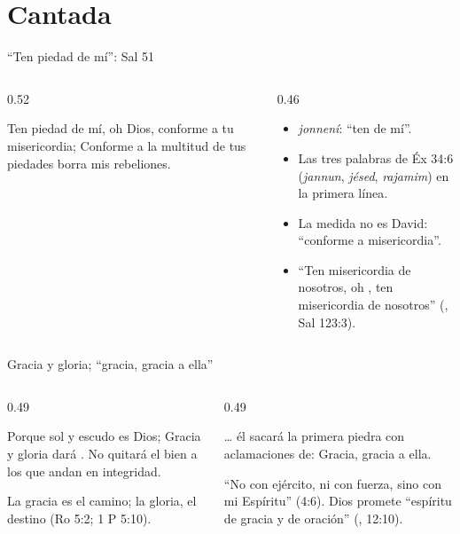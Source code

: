 \section{Cantada}

\begin{frame}{``Ten piedad de mí'': Sal 51}
\begin{columns}[c,onlytextwidth]
\begin{column}{0.52\textwidth}
\centering{}
\begin{cita}Ten piedad de mí, oh Dios, conforme a tu misericordia; Conforme a la multitud de tus piedades borra mis rebeliones.\end{cita}
\end{column}
\begin{column}{0.46\textwidth}\small\RaggedRight
\begin{itemize}
\item {} \emph{jonnení}: ``ten  de mí''.
\item Las tres palabras de Éx 34:6 (\emph{jannun}, \emph{jésed}, \emph{rajamim}) en la primera línea.
\item La medida no es David: ``conforme a  misericordia''.
\item ``Ten misericordia de nosotros, oh \SENOR, ten misericordia de nosotros'' (, Sal 123:3).
\end{itemize}
\end{column}
\end{columns}
\end{frame}

\begin{frame}{Gracia y gloria; ``gracia, gracia a ella''}
\begin{columns}[t,onlytextwidth]
\begin{column}{0.49\textwidth}
\centering{}
\begin{cita}Porque sol y escudo es \SENOR{} Dios; Gracia y gloria dará \SENOR. No quitará el bien a los que andan en integridad.\end{cita}
\scriptsize La gracia es el camino; la gloria, el destino (Ro 5:2; 1 P 5:10).
\end{column}
\begin{column}{0.49\textwidth}
\centering{}
\begin{cita}\ldots{} él sacará la primera piedra con aclamaciones de: Gracia, gracia a ella.\end{cita}
\scriptsize ``No con ejército, ni con fuerza, sino con mi Espíritu'' (4:6). Dios promete ``espíritu de gracia y de oración'' (, 12:10).
\end{column}
\end{columns}
\end{frame}

